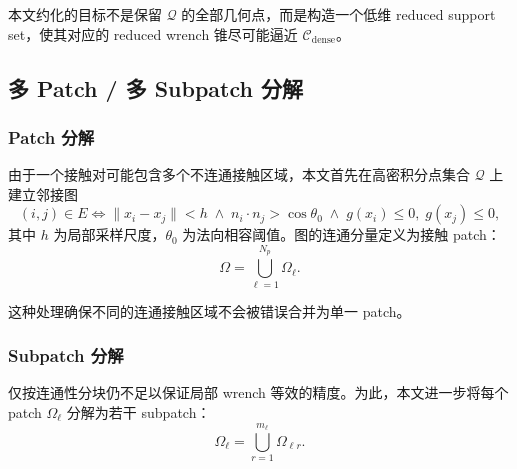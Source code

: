 本文约化的目标不是保留 $\mathcal{Q}$ 的全部几何点，而是构造一个低维 reduced support set，使其对应的 reduced wrench 锥尽可能逼近 $\mathcal{C}_{\mathrm{dense}}$。

\subsection{多 Patch / 多 Subpatch 分解}

\subsubsection{Patch 分解}

由于一个接触对可能包含多个不连通接触区域，本文首先在高密积分点集合 $\mathcal{Q}$ 上建立邻接图
\begin{equation}
(i,j)\in E
\iff
\|x_i - x_j\| < h
\;\land\;
n_i \cdot n_j > \cos\theta_0
\;\land\;
g(x_i)\le 0,\; g(x_j)\le 0,
\end{equation}
其中 $h$ 为局部采样尺度，$\theta_0$ 为法向相容阈值。图的连通分量定义为接触 patch：
\begin{equation}
\Omega = \bigcup_{\ell=1}^{N_p} \Omega_\ell.
\end{equation}

这种处理确保不同的连通接触区域不会被错误合并为单一 patch。

\subsubsection{Subpatch 分解}

仅按连通性分块仍不足以保证局部 wrench 等效的精度。为此，本文进一步将每个 patch $\Omega_\ell$ 分解为若干 subpatch：
\begin{equation}
\Omega_\ell = \bigcup_{r=1}^{m_\ell} \Omega_{\ell r}.
\end{equation}

